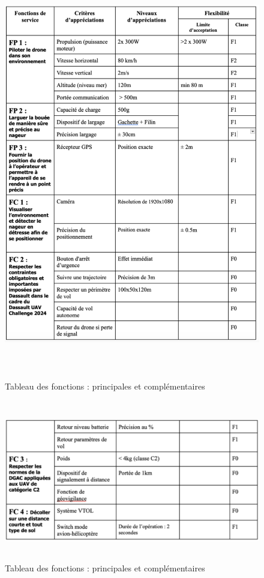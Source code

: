 \documentclass[a4paper,12pt,french]{report}
\begin{document}
\begin{figure}[h]
    \centering
    \includegraphics[height=18cm]{figures/tab1.png}
    \caption{Tableau des fonctions : principales et complémentaires}
    \label{fonctions}
\end{figure}

\begin{figure}[h]
    \centering
    \includegraphics[height=7cm]{figures/tab2.png}
    \caption{Tableau des fonctions : principales et complémentaires}
    \label{fonctions}
\end{figure}
\end{document}
